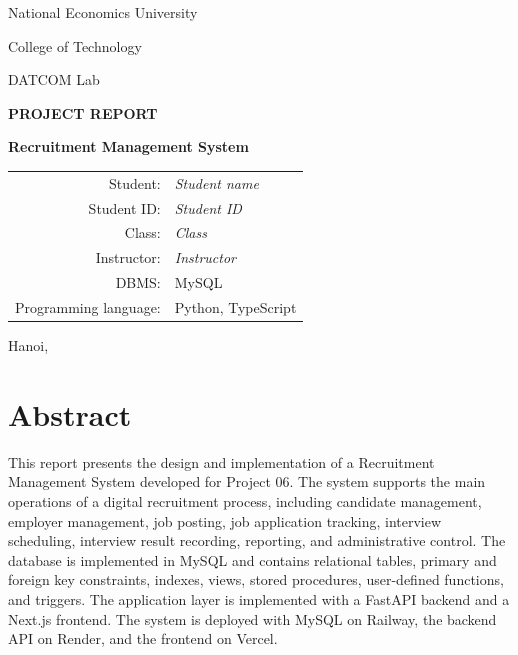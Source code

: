 \documentclass[12pt,a4paper]{report}
\newcommand{\projectname}{Recruitment Management System}
\newcommand{\studentname}{\textit{Student name}}
\newcommand{\studentid}{\textit{Student ID}}
\newcommand{\classname}{\textit{Class}}
\newcommand{\teachername}{\textit{Instructor}}
\begin{document}

\begin{titlepage}
  \centering
  {\Large National Economics University\par}
  {\Large College of Technology\par}
  {\Large DATCOM Lab\par}
  \vspace{2.5cm}
  {\huge\bfseries PROJECT REPORT\par}
  \vspace{0.8cm}
  {\LARGE\bfseries \projectname\par}
  \vspace{1.5cm}
  \begin{tabular}{rl}
    Student: & \studentname \\
    Student ID: & \studentid \\
    Class: & \classname \\
    Instructor: & \teachername \\
    DBMS: & MySQL \\
    Programming language: & Python, TypeScript \\
  \end{tabular}
  \vfill
  {\large Hanoi, \the\year\par}
\end{titlepage}


\chapter*{Abstract}

This report presents the design and implementation of a \projectname{} developed for Project 06. The system supports the main operations of a digital recruitment process, including candidate management, employer management, job posting, job application tracking, interview scheduling, interview result recording, reporting, and administrative control. The database is implemented in MySQL and contains relational tables, primary and foreign key constraints, indexes, views, stored procedures, user-defined functions, and triggers. The application layer is implemented with a FastAPI backend and a Next.js frontend. The system is deployed with MySQL on Railway, the backend API on Render, and the frontend on Vercel.
\end{document}
